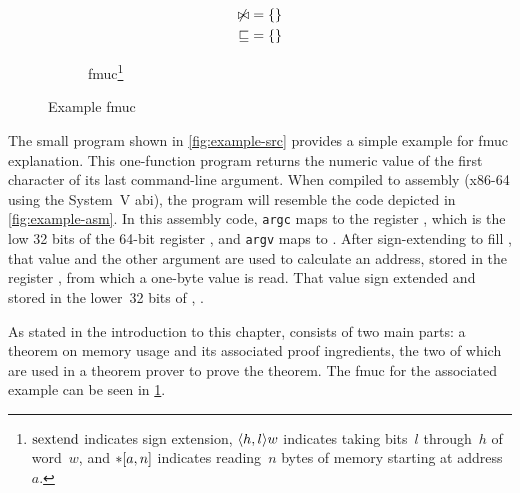 \begin{figure*}
\begin{subfigure}{\linewidth}
\begin{subequations}
\begin{align}
\begin{aligned}
        \not\bowtie &= \{\} \\
        \sqsubseteq &= \{\}
      \end{aligned} \notag
    \end{align}
    \end{subequations}
    \caption{\Acl*{fmuc}\footnote{%
      $\operatorname{sextend}$ indicates sign extension,
      $\langle h,l\rangle w$ indicates taking bits~$l$ through~$h$ of word~$w$,
      and $\ast[a,n]$ indicates reading~$n$ bytes of memory
      starting at address~$a$.
    }}\label{fig:fmuc-thm}
  \end{subfigure}
  \caption{Example \acl*{fmuc}}\label{fig:fmuc}
\end{figure*}

The small program shown in \cref{fig:example-src} provides a simple example
for \ac{fmuc} explanation. This one-function program
returns the numeric value of the first character of its last command-line argument.
When compiled to assembly (x86-64 using the System~V \ac{abi}),
the program will resemble the code depicted in \cref{fig:example-asm}.
In this assembly code,
\lstinline|argc| maps to the register ,
which is the low 32 bits of the 64-bit register ,
and \lstinline|argv| maps to .
After sign-extending  to fill ,
that value and the other argument are used to calculate
an address, stored in the register ,
from which a one-byte value is read.
That value sign extended and stored in the lower~32 bits of ,
.

As stated in the introduction to this chapter,  consists of two main parts:
a theorem on memory usage and its associated proof ingredients,%
%
the two of which are used in a theorem prover to prove the theorem.
The \ac{fmuc} for the associated example can be seen in \cref{fig:fmuc-thm}.

